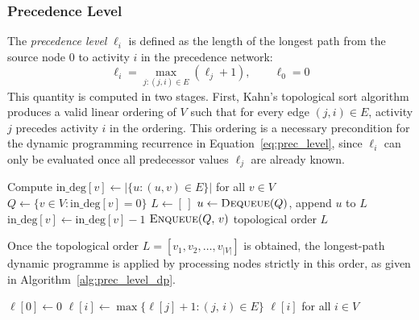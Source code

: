 \subsubsection*{Precedence Level}
\label{subsubsec:prec_level}
The \textit{precedence level} $\ell_i$ is defined as the length of the
longest path from the source node $0$ to activity $i$ in the precedence
network:
\begin{equation}
    \ell_i = \max_{j : (j,i) \in E} (\ell_j + 1),
    \qquad \ell_0 = 0
    \label{eq:prec_level}
\end{equation}
This quantity is computed in two stages. First, Kahn's topological sort
algorithm \parencite{Kahn1962} produces a valid linear ordering of $V$
such that for every edge $(j,i) \in E$, activity $j$ precedes activity
$i$ in the ordering. This ordering is a necessary precondition for the
dynamic programming recurrence in Equation~\eqref{eq:prec_level}, since
$\ell_i$ can only be evaluated once all predecessor values $\ell_j$ are
already known.
\begin{algorithm}[ht]
\caption{Kahn's topological sort \parencite{Kahn1962}}
\label{alg:kahn}
\begin{algorithmic}[1]
\State Compute $\mathrm{in\_deg}[v] \leftarrow
       |\{u : (u,v) \in E\}|$ for all $v \in V$
\State $Q \leftarrow \{v \in V : \mathrm{in\_deg}[v] = 0\}$
\State $L \leftarrow [\,]$
    \State $u \leftarrow \textsc{Dequeue}(Q)$,\;
           append $u$ to $L$
        \State $\mathrm{in\_deg}[v] \leftarrow
               \mathrm{in\_deg}[v] - 1$
            \State $\textsc{Enqueue}(Q,\, v)$
        \EndIf
    \EndFor
\EndWhile
\State \Return topological order $L$
\end{algorithmic}
\end{algorithm}
Once the topological order $L = [v_1, v_2, \ldots, v_{|V|}]$
is obtained, the longest-path dynamic programme is applied by
processing nodes strictly in this order, as given in
Algorithm~\ref{alg:prec_level_dp}.

\begin{algorithm}[ht]
\caption{Longest-path DP for precedence levels}
\label{alg:prec_level_dp}
\begin{algorithmic}[1]
\State $\ell[0] \leftarrow 0$
    \State $\ell[i] \leftarrow
           \max\bigl\{\ell[j] + 1 : (j,\,i) \in E\bigr\}$
\EndFor
\State \Return $\ell[i]$ for all $i \in V$
\end{algorithmic}
\end{algorithm}


